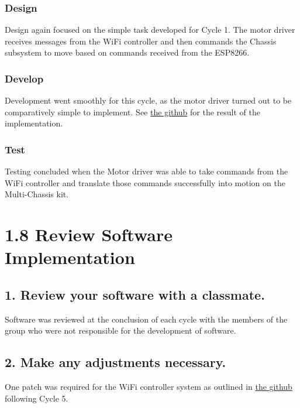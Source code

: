 \documentclass{article}
\begin{document}
\subsubsection*{Design}
Design again focused on the simple task developed for Cycle 1.  The motor driver receives messages from the WiFi controller and then commands the Chassis subsystem to move based on commands received from the ESP8266.

\subsubsection*{Develop}
Development went smoothly for this cycle, as the motor driver turned out to be comparatively simple to implement.  See \href{https://github.com/Shamshel/ECE5770/commit/7c3a11e5c96f9c3f0fa2e360a50f103b7e07cb66}{the github} for the result of the implementation.

\subsubsection*{Test}
Testing concluded when the Motor driver was able to take commands from the WiFi controller and translate those commands successfully into motion on the Multi-Chassis kit.


\section*{1.8 Review Software Implementation}

\subsection*{1. Review your software with a classmate.}
Software was reviewed at the conclusion of each cycle with the members of the group who were not responsible for the development of software.

\subsection*{2. Make any adjustments necessary.}
One patch was required for the WiFi controller system as outlined in \href{https://github.com/Shamshel/ECE5770/commit/7c3a11e5c96f9c3f0fa2e360a50f103b7e07cb66}{the github} following Cycle 5.
\end{document}
